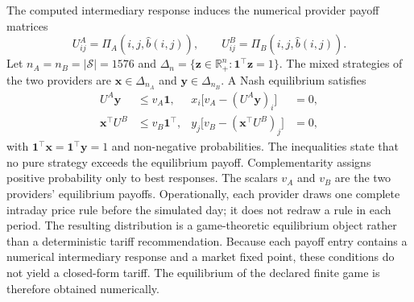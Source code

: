 \documentclass[11pt,a4paper]{article}
\newcommand{\Sset}{\mathcal{S}}
\begin{document}
The computed intermediary response induces the numerical provider payoff matrices
\begin{equation}
U^A_{ij}=\Pi_A(i,j,\widehat b(i,j)),
\qquad
U^B_{ij}=\Pi_B(i,j,\widehat b(i,j)).
\label{eq:bimatrix}
\end{equation}
Let $n_A=n_B=|\Sset|=1576$ and $\Delta_n=\{\boldsymbol z\in\mathbb R_+^n:\boldsymbol 1^\top\boldsymbol z=1\}$. The mixed strategies of the two providers are $\boldsymbol x\in\Delta_{n_A}$ and $\boldsymbol y\in\Delta_{n_B}$. A Nash equilibrium satisfies
\begin{align}
U^A\boldsymbol y&\le v_A\boldsymbol 1,
&x_i\bigl[v_A-(U^A\boldsymbol y)_i\bigr]&=0,\label{eq:nash_row_conditions}\\
\boldsymbol x^\top U^B&\le v_B\boldsymbol 1^\top,
&y_j\bigl[v_B-(\boldsymbol x^\top U^B)_j\bigr]&=0,\label{eq:nash_col_conditions}
\end{align}
with $\boldsymbol 1^\top\boldsymbol x=\boldsymbol 1^\top\boldsymbol y=1$ and non-negative probabilities. The inequalities state that no pure strategy exceeds the equilibrium payoff. Complementarity assigns positive probability only to best responses.
The scalars $v_A$ and $v_B$ are the two providers' equilibrium payoffs.
Operationally, each provider draws one complete intraday price rule before the simulated day; it does not redraw a rule in each period. The resulting distribution is a game-theoretic equilibrium object rather than a deterministic tariff recommendation.
Because each payoff entry contains a numerical intermediary response and a market fixed point, these conditions do not yield a closed-form tariff. The equilibrium of the declared finite game is therefore obtained numerically.
\end{document}
